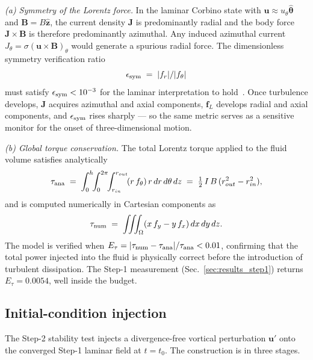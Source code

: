 \documentclass[aps,prl,twocolumn,superscriptaddress]{revtex4-2}
\begin{document}
\textit{(a) Symmetry of the Lorentz force.}  In the laminar Corbino
state with $\mathbf{u}\!\approx\!u_\theta\hat{\boldsymbol\theta}$ and
$\mathbf{B} = B\hat{\mathbf{z}}$, the current density $\mathbf{J}$ is
predominantly radial and the body force
$\mathbf{J}\!\times\!\mathbf{B}$ is therefore predominantly azimuthal.
Any induced azimuthal current
$J_\theta = \sigma(\mathbf{u}\!\times\!\mathbf{B})_\theta$ would
generate a spurious radial force.  The dimensionless symmetry
verification ratio
\begin{equation}
\epsilon_{\rm sym} \;=\; |f_r|/|f_\theta|
\label{eq:eps_sym}
\end{equation}
must satisfy $\epsilon_{\rm sym} < 10^{-3}$ for the laminar
interpretation to hold~\cite{2}.  Once turbulence develops,
$\mathbf{J}$ acquires azimuthal and axial components, $\mathbf{f}_L$
develops radial and axial components, and $\epsilon_{\rm sym}$ rises
sharply --- so the same metric serves as a sensitive monitor for the
onset of three-dimensional motion.

\textit{(b) Global torque conservation.}  The total Lorentz torque
applied to the fluid volume satisfies analytically
\begin{equation}
\tau_{\rm ana}
   \;=\; \int_{0}^{h}\!\!\int_{0}^{2\pi}\!\!\int_{r_{in}}^{r_{out}}\!
        (r\,f_\theta)\,r\,dr\,d\theta\,dz
   \;=\; \tfrac{1}{2}\,I\,B\,(r_{out}^{2} - r_{in}^{2}),
\label{eq:torque_ana}
\end{equation}
and is computed numerically in Cartesian components as~\cite{2}
\begin{equation}
\tau_{\rm num} \;=\; \iiint_\Omega (x\,f_y - y\,f_x)\,dx\,dy\,dz.
\label{eq:torque_num}
\end{equation}
The model is verified when
$E_\tau = |\tau_{\rm num} - \tau_{\rm ana}|/\tau_{\rm ana} < 0.01$,
confirming that the total power injected into the fluid is
physically correct before the introduction of turbulent dissipation.
The Step-1 measurement (Sec.~\ref{sec:results_step1}) returns
$E_\tau = 0.0054$, well inside the budget.

\subsection{Initial-condition injection}
\label{sec:ic_injection}

The Step-2 stability test injects a divergence-free vortical
perturbation $\mathbf{u}'$ onto the converged Step-1 laminar field at
$t = t_0$.  The construction is in three stages.
\end{document}
